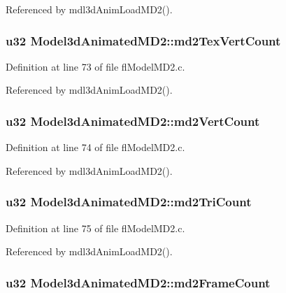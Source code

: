 Referenced by mdl3d\-Anim\-Load\-MD2().
\subsubsection{\setlength{\rightskip}{0pt plus 5cm}u32 {\bf Model3d\-Animated\-MD2::md2Tex\-Vert\-Count}}\label{structModel3dAnimatedMD2_0f02400bc89011b5279fbde8f49f756e}




Definition at line 73 of file fl\-Model\-MD2.c.

Referenced by mdl3d\-Anim\-Load\-MD2().
\subsubsection{\setlength{\rightskip}{0pt plus 5cm}u32 {\bf Model3d\-Animated\-MD2::md2Vert\-Count}}\label{structModel3dAnimatedMD2_fc7188cb2c13ea68efc2ebf627a484ad}




Definition at line 74 of file fl\-Model\-MD2.c.

Referenced by mdl3d\-Anim\-Load\-MD2().
\subsubsection{\setlength{\rightskip}{0pt plus 5cm}u32 {\bf Model3d\-Animated\-MD2::md2Tri\-Count}}\label{structModel3dAnimatedMD2_6d97a9a02aaf97abe329c4982fd40b32}




Definition at line 75 of file fl\-Model\-MD2.c.

Referenced by mdl3d\-Anim\-Load\-MD2().
\subsubsection{\setlength{\rightskip}{0pt plus 5cm}u32 {\bf Model3d\-Animated\-MD2::md2Frame\-Count}}\label{structModel3dAnimatedMD2_982b177f1e7eabc2eff5ff6dce05704e}




